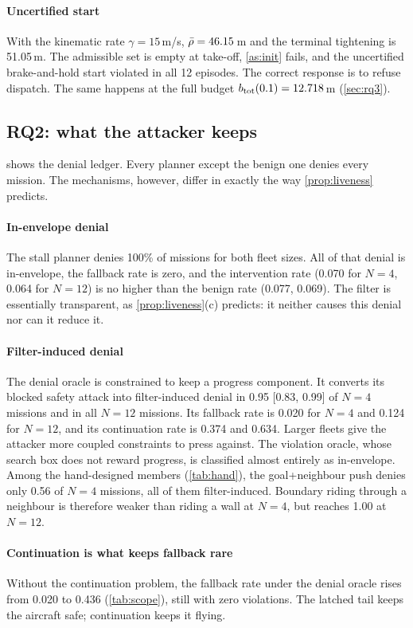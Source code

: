 \paragraph{Uncertified start} With the kinematic rate $\gamma=15$\,m/s,
$\bar\rho=46.15$\,m and the terminal tightening is 51.05\,m. The admissible set
is empty at take-off, \cref{as:init} fails, and the uncertified
brake-and-hold start violated in all 12 episodes. The correct response is
to refuse dispatch. The same happens at the full budget
$b_{\mathrm{tot}}(0.1)=12.718$\,m (\cref{sec:rq3}).

\subsection{RQ2: what the attacker keeps}\label{sec:rq2}
 shows the denial ledger. Every planner except the benign
one denies every mission. The mechanisms, however, differ in exactly the way
\cref{prop:liveness} predicts.

\paragraph{In-envelope denial} The stall planner denies 100\% of missions
for both fleet sizes. All of that denial is in-envelope, the fallback rate
is zero, and the intervention rate (0.070 for $N=4$, 0.064 for $N=12$) is no
higher than the benign rate (0.077, 0.069). The filter is essentially
transparent, as \cref{prop:liveness}(c) predicts: it neither causes this
denial nor can it reduce it.

\paragraph{Filter-induced denial} The denial oracle is constrained to keep a
progress component. It converts its blocked safety attack into
filter-induced denial in 0.95 [0.83, 0.99] of $N=4$ missions and in all $N=12$
missions. Its fallback rate is 0.020 for $N=4$ and 0.124 for $N=12$, and its
continuation rate is 0.374 and 0.634. Larger fleets give the attacker more
coupled constraints to press against. The violation oracle, whose search box
does not reward progress, is classified almost entirely as in-envelope. Among
the hand-designed members (\cref{tab:hand}), the goal+neighbour push denies
only 0.56 of $N=4$ missions, all of them filter-induced. Boundary riding
through a neighbour is therefore weaker than riding a wall at $N=4$, but
reaches 1.00 at $N=12$.

\paragraph{Continuation is what keeps fallback rare} Without the
continuation problem, the fallback rate under the denial oracle rises from
0.020 to 0.436 (\cref{tab:scope}), still with zero violations. The
latched tail keeps the aircraft safe; continuation keeps it flying.

